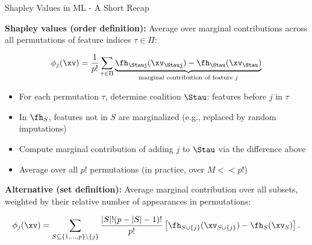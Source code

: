 \documentclass[11pt,compress,t,notes=noshow, aspectratio=169, xcolor=table]{beamer}
\begin{document}
\begin{frame}{Shapley Values in ML - A Short Recap}

% 
% 
\textbf{Shapley values (order definition):} Average over marginal contributions across all permutations of feature indices $\tau \in \Pi$:

\[
\phi_j(\xv) = \frac{1}{p!} \sum_{\tau \in \Pi} 
\underbrace{\fh_{\Stauj}(\xv_{\Stauj}) - \fh_{\Stau}(\xv_{\Stau})}_{\text{marginal contribution of feature $j$}}
\]

\begin{itemize}
  \item For each permutation $\tau$, determine coalition $\Stau$: features before $j$ in $\tau$
  \item In \(\fh_S\), features not in \(S\) are marginalized (e.g., replaced by random imputations)
  \item Compute marginal contribution of adding $j$ to $\Stau$ via the difference above
  \item Average over all $p!$ permutations (in practice, over $M << p!$)
\end{itemize}

\pause\medskip

\textbf{Alternative (set definition):} Average marginal contribution over all subsets, weighted by their relative number of appearances in permutations:

\[
\phi_j(\xv) = 
\sum_{S \subseteq \{1,\dots,p\} \setminus \{j\}} \frac{|S|!(p - |S| - 1)!}{p!} \left[\fh_{S \cup \{j\}}(\xv_{S \cup \{j\}}) - \fh_S(\xv_S)\right].
\]
% 
% 

\end{frame}
\end{document}
